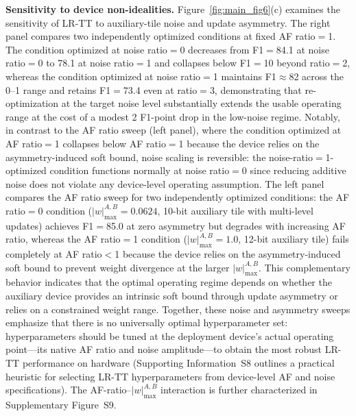 \documentclass[AMA,LATO2COL]{WileyNJDv5}
\begin{document}
\noindent
\textbf{Sensitivity to device non-idealities.}
Figure~\ref{fig:main_fig6}(c) examines the sensitivity of LR-TT to auxiliary-tile noise and update asymmetry. The right panel compares two independently optimized conditions at fixed AF ratio\(=\)1. The condition optimized at noise ratio\(=\)0 decreases from F1\(=\)84.1 at noise ratio\(=\)0 to 78.1 at noise ratio\(=\)1 and collapses below F1\(=\)10 beyond ratio\(=\)2, whereas the condition optimized at noise ratio\(=\)1 maintains F1\(\approx\)82 across the 0--1 range and retains F1\(=\)73.4 even at ratio\(=\)3, demonstrating that re-optimization at the target noise level substantially extends the usable operating range at the cost of a modest 2 F1-point drop in the low-noise regime. Notably, in contrast to the AF ratio sweep (left panel), where the condition optimized at AF ratio\(=\)1 collapses below AF ratio\(=\)1 because the device relies on the asymmetry-induced soft bound, noise scaling is reversible: the noise-ratio\(=\)1-optimized condition functions normally at noise ratio\(=\)0 since reducing additive noise does not violate any device-level operating assumption. The left panel compares the AF ratio sweep for two independently optimized conditions: the AF ratio\(=\)0 condition (\(|w|_{\max}^{A,B}=0.0624\), 10-bit auxiliary tile with multi-level updates) achieves F1\(=\)85.0 at zero asymmetry but degrades with increasing AF ratio, whereas the AF ratio\(=\)1 condition (\(|w|_{\max}^{A,B}=1.0\), 12-bit auxiliary tile) fails completely at AF ratio\(<\)1 because the device relies on the asymmetry-induced soft bound to prevent weight divergence at the larger \(|w|_{\max}^{A,B}\). This complementary behavior indicates that the optimal operating regime depends on whether the auxiliary device provides an intrinsic soft bound through update asymmetry or relies on a constrained weight range. Together, these noise and asymmetry sweeps emphasize that there is no universally optimal hyperparameter set: hyperparameters should be tuned at the deployment device's actual operating point---its native AF ratio and noise amplitude---to obtain the most robust LR-TT performance on hardware (Supporting Information~S8 outlines a practical heuristic for selecting LR-TT hyperparameters from device-level AF and noise specifications). The AF-ratio--\(|w|_{\max}^{A,B}\) interaction is further characterized in Supplementary Figure~S9.
\end{document}

